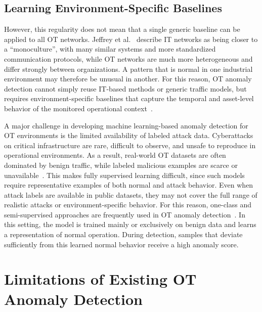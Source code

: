 \subsection{Learning Environment-Specific Baselines}
However, this regularity does not mean that a single generic baseline can be applied to all OT networks. Jeffrey et al.~\cite{jeffrey_hybrid_2024} describe IT networks as being closer to a ``monoculture'', with many similar systems and more standardized communication protocols, while OT networks are much more heterogeneous and differ strongly between organizations. A pattern that is normal in one industrial environment may therefore be unusual in another. For this reason, OT anomaly detection cannot simply reuse IT-based methods or generic traffic models, but requires environment-specific baselines that capture the temporal and asset-level behavior of the monitored operational context~\cite{jeffrey_hybrid_2024}.



A major challenge in developing machine learning-based anomaly detection for OT environments is the limited availability of labeled attack data. Cyberattacks on critical infrastructure are rare, difficult to observe, and unsafe to reproduce in operational environments. As a result, real-world OT datasets are often dominated by benign traffic, while labeled malicious examples are scarce or unavailable~\cite{jeffrey_hybrid_2024, wang_guardians_2026}. This makes fully supervised learning difficult, since such models require representative examples of both normal and attack behavior. Even when attack labels are available in public datasets, they may not cover the full range of realistic attacks or environment-specific behavior. For this reason, one-class and semi-supervised approaches are frequently used in OT anomaly detection~\cite{catillo_cps-guard_2023, jeffrey_hybrid_2024, meira_performance_2020}. In this setting, the model is trained mainly or exclusively on benign data and learns a representation of normal operation. During detection, samples that deviate sufficiently from this learned normal behavior receive a high anomaly score.

\section{Limitations of Existing OT Anomaly Detection}

